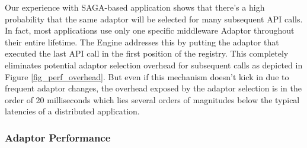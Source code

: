 Our experience with SAGA-based application shows that there’s a high probability that the same adaptor will be selected for many subsequent API calls. In fact, most applications use only one specific middleware Adaptor throughout their entire lifetime. The Engine addresses this by putting the adaptor that executed the last API call in the first position of the registry. This completely eliminates potential adaptor selection overhead for subsequent calls as depicted in Figure \ref{fig_perf_overhead}. But even if this mechanism doesn't kick in due to frequent adaptor changes, the overhead exposed by the adaptor selection is in the order of 20 milliseconds which lies several orders of magnitudes below the typical latencies of a distributed application.


\subsubsection{Adaptor Performance}\label{perf_adaptors}

